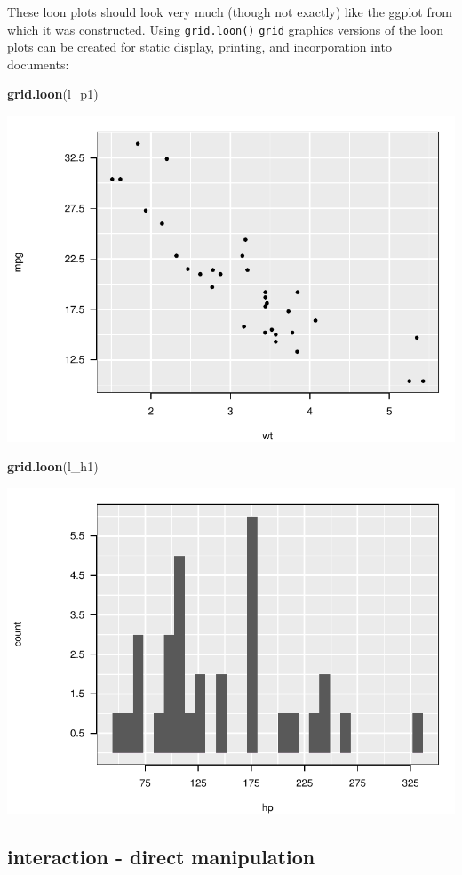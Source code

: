 \documentclass[]{article}
\newenvironment{Shaded}{\begin{snugshade}}{\end{snugshade}}
\newcommand{\KeywordTok}[1]{\textcolor[rgb]{0.13,0.29,0.53}{\textbf{#1}}}
\newcommand{\NormalTok}[1]{#1}
\begin{document}
These loon plots should look very much (though not exactly) like the
ggplot from which it was constructed. Using \texttt{grid.loon()}
\texttt{grid} graphics versions of the loon plots can be created for
static display, printing, and incorporation into documents:

\begin{Shaded}
\begin{Highlighting}[]
\KeywordTok{grid.loon}\NormalTok{(l_p1)}
\end{Highlighting}
\end{Shaded}

\begin{center}\includegraphics[width=0.5\linewidth]{ggplots2loon_files/figure-latex/grid version of l_p1-1} \end{center}

\begin{Shaded}
\begin{Highlighting}[]
\KeywordTok{grid.loon}\NormalTok{(l_h1)}
\end{Highlighting}
\end{Shaded}

\begin{center}\includegraphics[width=0.5\linewidth]{ggplots2loon_files/figure-latex/grid version of l_h1-1} \end{center}

\subsection{interaction - direct
manipulation}\label{interaction---direct-manipulation}
\end{document}
